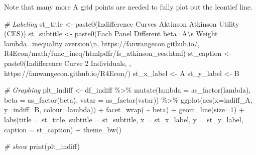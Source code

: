 \documentclass[
]{book}
\newenvironment{Shaded}{\begin{snugshade}}{\end{snugshade}}
\newcommand{\AttributeTok}[1]{\textcolor[rgb]{0.77,0.63,0.00}{#1}}
\newcommand{\CommentTok}[1]{\textcolor[rgb]{0.56,0.35,0.01}{\textit{#1}}}
\newcommand{\DecValTok}[1]{\textcolor[rgb]{0.00,0.00,0.81}{#1}}
\newcommand{\FunctionTok}[1]{\textcolor[rgb]{0.00,0.00,0.00}{#1}}
\newcommand{\NormalTok}[1]{#1}
\newcommand{\OtherTok}[1]{\textcolor[rgb]{0.56,0.35,0.01}{#1}}
\newcommand{\SpecialCharTok}[1]{\textcolor[rgb]{0.00,0.00,0.00}{#1}}
\newcommand{\StringTok}[1]{\textcolor[rgb]{0.31,0.60,0.02}{#1}}
\begin{document}
Note that many more A grid points are needed to fully plot out the leontief line.

\begin{Shaded}
\begin{Highlighting}[]
\CommentTok{\# Labeling}
\NormalTok{st\_title }\OtherTok{\textless{}{-}} \FunctionTok{paste0}\NormalTok{(}\StringTok{\textquotesingle{}Indifference Curves Aktinson Atkinson Utility (CES)\textquotesingle{}}\NormalTok{)}
\NormalTok{st\_subtitle }\OtherTok{\textless{}{-}} \FunctionTok{paste0}\NormalTok{(}\StringTok{\textquotesingle{}Each Panel Different beta=A}\SpecialCharTok{\textbackslash{}\textquotesingle{}}\StringTok{s Weight lambda=inequality aversion}\SpecialCharTok{\textbackslash{}n}\StringTok{\textquotesingle{}}\NormalTok{,}
                      \StringTok{\textquotesingle{}https://fanwangecon.github.io/\textquotesingle{}}\NormalTok{,}
                      \StringTok{\textquotesingle{}R4Econ/math/func\_ineq/htmlpdfr/fs\_atkinson\_ces.html\textquotesingle{}}\NormalTok{)}
\NormalTok{st\_caption }\OtherTok{\textless{}{-}} \FunctionTok{paste0}\NormalTok{(}\StringTok{\textquotesingle{}Indifference Curve 2 Individuals, \textquotesingle{}}\NormalTok{,}
                     \StringTok{\textquotesingle{}https://fanwangecon.github.io/R4Econ/\textquotesingle{}}\NormalTok{)}
\NormalTok{st\_x\_label }\OtherTok{\textless{}{-}} \StringTok{\textquotesingle{}A\textquotesingle{}}
\NormalTok{st\_y\_label }\OtherTok{\textless{}{-}} \StringTok{\textquotesingle{}B\textquotesingle{}}

\CommentTok{\# Graphing}
\NormalTok{plt\_indiff }\OtherTok{\textless{}{-}} 
\NormalTok{  df\_indiff }\SpecialCharTok{\%\textgreater{}\%} \FunctionTok{mutate}\NormalTok{(}\AttributeTok{lambda =} \FunctionTok{as\_factor}\NormalTok{(lambda),}
                       \AttributeTok{beta =} \FunctionTok{as\_factor}\NormalTok{(beta),}
                       \AttributeTok{vstar =} \FunctionTok{as\_factor}\NormalTok{(vstar)) }\SpecialCharTok{\%\textgreater{}\%}
  \FunctionTok{ggplot}\NormalTok{(}\FunctionTok{aes}\NormalTok{(}\AttributeTok{x=}\NormalTok{indiff\_A, }\AttributeTok{y=}\NormalTok{indiff\_B,}
             \AttributeTok{colour=}\NormalTok{lambda)) }\SpecialCharTok{+}
  \FunctionTok{facet\_wrap}\NormalTok{( }\SpecialCharTok{\textasciitilde{}}\NormalTok{ beta) }\SpecialCharTok{+}
  \FunctionTok{geom\_line}\NormalTok{(}\AttributeTok{size=}\DecValTok{1}\NormalTok{) }\SpecialCharTok{+}
  \FunctionTok{labs}\NormalTok{(}\AttributeTok{title =}\NormalTok{ st\_title, }\AttributeTok{subtitle =}\NormalTok{ st\_subtitle,}
       \AttributeTok{x =}\NormalTok{ st\_x\_label, }\AttributeTok{y =}\NormalTok{ st\_y\_label, }\AttributeTok{caption =}\NormalTok{ st\_caption) }\SpecialCharTok{+}
  \FunctionTok{theme\_bw}\NormalTok{()}

\CommentTok{\# show}
\FunctionTok{print}\NormalTok{(plt\_indiff)}
\end{Highlighting}
\end{Shaded}
\end{document}
